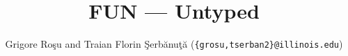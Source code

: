 
\setlength{\parindent}{1em}
\title{FUN --- Untyped}
\author{Grigore Ro\c{s}u and 
        Traian Florin \c{S}erb\u{a}nu\c{t}\u{a} (\texttt{\{grosu,tserban2\}@illinois.edu})}

\maketitle


